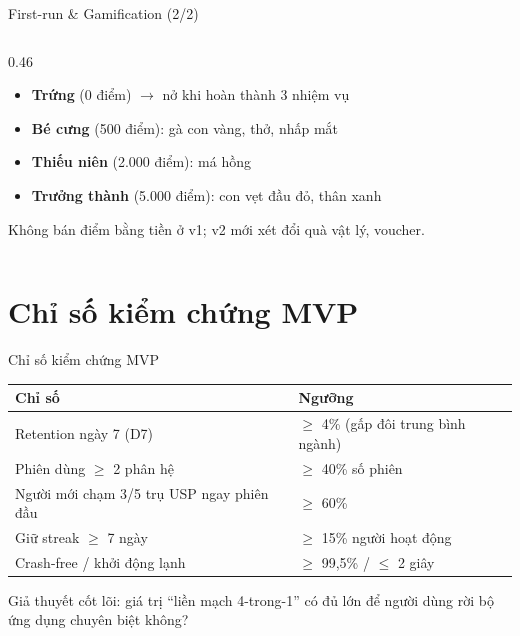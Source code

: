 \documentclass[aspectratio=169]{beamer}
\begin{document}
\begin{frame}{First-run \& Gamification (2/2)}
\begin{columns}
\begin{column}{0.46\textwidth}
      {\tiny
      \begin{itemize}\itemsep1pt
        \item \textbf{Trứng} (0 điểm) $\rightarrow$ nở khi hoàn thành 3 nhiệm vụ
        \item \textbf{Bé cưng} (500 điểm): gà con vàng, thở, nhấp mắt
        \item \textbf{Thiếu niên} (2.000 điểm): má hồng
        \item \textbf{Trưởng thành} (5.000 điểm): con vẹt đầu đỏ, thân xanh
      \end{itemize}}
      \vspace{1mm}
      {\tiny\color{brandgray} Không bán điểm bằng tiền ở v1; v2 mới xét đổi quà vật lý, voucher.}
    \end{column}
  \end{columns}
\end{frame}

\section{Chỉ số kiểm chứng MVP}
\begin{frame}{Chỉ số kiểm chứng MVP}
  \small
  \begin{tabular}{@{}p{6.6cm}p{4.6cm}@{}}
    \toprule
    \textbf{Chỉ số} & \textbf{Ngưỡng} \\
    \midrule
    Retention ngày 7 (D7) & $\geq$ 4\% (gấp đôi trung bình ngành) \\
    Phiên dùng $\geq$ 2 phân hệ & $\geq$ 40\% số phiên \\
    Người mới chạm 3/5 trụ USP ngay phiên đầu & $\geq$ 60\% \\
    Giữ streak $\geq$ 7 ngày & $\geq$ 15\% người hoạt động \\
    Crash-free / khởi động lạnh & $\geq$ 99,5\% / $\leq$ 2 giây \\
    \bottomrule
  \end{tabular}
  \vfill
  {\small Giả thuyết cốt lõi: giá trị ``liền mạch 4-trong-1'' có đủ lớn để người dùng rời bộ ứng dụng chuyên biệt không?}
\end{frame}

\end{document}
